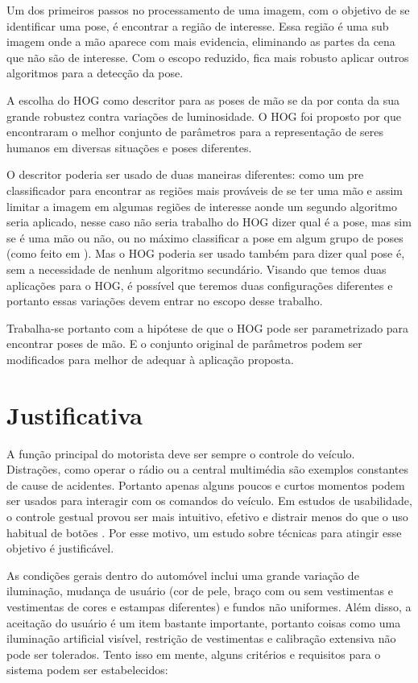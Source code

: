Um dos primeiros passos no processamento de uma imagem, com o objetivo de se identificar uma pose, é encontrar a região de interesse. Essa região é uma sub imagem onde a mão aparece com mais evidencia, eliminando as partes da cena que não são de interesse. Com o escopo reduzido, fica mais robusto aplicar outros algoritmos para a detecção da pose.

A escolha do HOG como descritor para as poses de mão se da por conta da sua grande robustez contra variações de luminosidade. O HOG foi proposto por  que encontraram o melhor conjunto de parâmetros para a representação de seres humanos em diversas situações e poses diferentes. 

O descritor poderia ser usado de duas maneiras diferentes: como um pre classificador para encontrar as regiões mais prováveis de se ter uma mão e assim limitar a imagem em algumas regiões de interesse aonde um segundo algoritmo seria aplicado, nesse caso não seria trabalho do HOG dizer qual é a pose, mas sim se é uma mão ou não, ou no máximo classificar a pose em algum grupo de poses (como feito em \cite{jiang2012robust}). Mas o HOG poderia ser usado também para dizer qual pose é, sem a necessidade de nenhum algoritmo secundário.
Visando que temos duas aplicações para o HOG, é possível que teremos duas configurações diferentes e portanto essas variações devem entrar no escopo desse trabalho.

Trabalha-se portanto com a hipótese de que o HOG pode ser parametrizado para encontrar poses de mão. E o conjunto original de parâmetros podem ser modificados para melhor de adequar à aplicação proposta.

\section{Justificativa}

A função principal do motorista deve ser sempre o controle do veículo. Distrações, como operar o rádio ou a central multimédia são exemplos constantes de cause de acidentes. Portanto apenas alguns poucos e curtos momentos podem ser usados para interagir com os comandos do veículo. Em estudos de usabilidade, o controle gestual provou ser mais intuitivo, efetivo \cite{zobl2001usability} e distrair menos do que o uso habitual de botões \cite{geiger2001intermodal}. Por esse motivo, um estudo sobre técnicas para atingir esse objetivo é justificável.

As condições gerais dentro do automóvel inclui uma grande variação de iluminação, mudança de usuário (cor de pele, braço com ou sem vestimentas e vestimentas de cores e estampas diferentes) e fundos não uniformes. Além disso, a aceitação do usuário é um item bastante importante, portanto coisas como uma iluminação artificial visível, restrição de vestimentas e calibração extensiva não pode ser tolerados. Tento isso em mente, alguns critérios e requisitos para o sistema podem ser estabelecidos:

